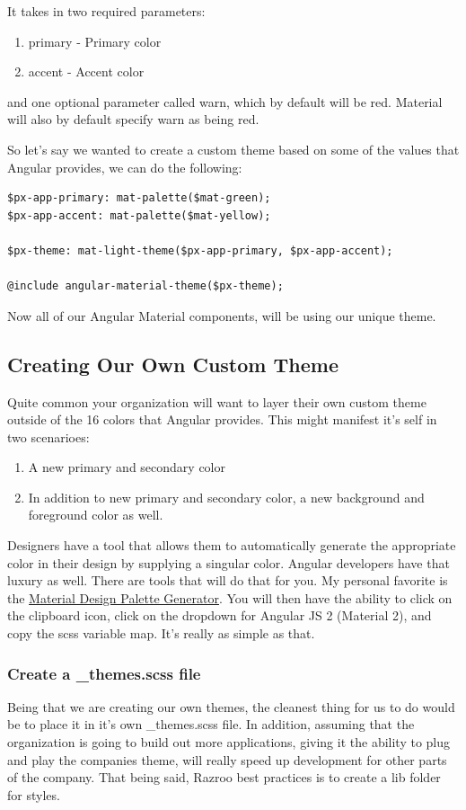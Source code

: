 It takes in two required parameters: 
\begin{enumerate}
  \item primary - Primary color
  \item accent - Accent color 
\end{enumerate}
and one optional parameter called warn, which by default will be red. Material 
will also by default specify warn as being red. 

So let's say we wanted to create a custom theme based on some of the values 
that Angular provides, we can do the following: 

\begin{lstlisting}
$px-app-primary: mat-palette($mat-green);
$px-app-accent: mat-palette($mat-yellow);

$px-theme: mat-light-theme($px-app-primary, $px-app-accent);

@include angular-material-theme($px-theme);
\end{lstlisting}

Now all of our Angular Material components, will be using our unique theme.

\subsection{Creating Our Own Custom Theme}
Quite common your organization will want to layer their own custom theme 
outside of the 16 colors that Angular provides. This might manifest it's 
self in two scenarioes: 
\begin{enumerate}
  \item A new primary and secondary color
  \item In addition to new primary and secondary color, a new background and 
  foreground color as well. 
\end{enumerate}

Designers have a tool that allows them to automatically generate the appropriate
color in their design by supplying a singular color. Angular developers have
that luxury as well. There are tools that will do that for you. My personal 
favorite is the \href{http://mcg.mbitson.com}{Material Design Palette Generator}.
You will then have the ability to click on the clipboard icon, click on the 
dropdown for Angular JS 2 (Material 2), and copy the scss variable map. It's 
really as simple as that. 

\subsubsection{Create a \_themes.scss file}
Being that we are creating our own themes, the cleanest thing for us to do would 
be to place it in it's own \_themes.scss file. In addition, assuming that the 
organization is going to build out more applications, giving it the ability to
plug and play the companies theme, will really speed up development for other
parts of the company. That being said, Razroo best practices is to create a lib
folder for styles.

